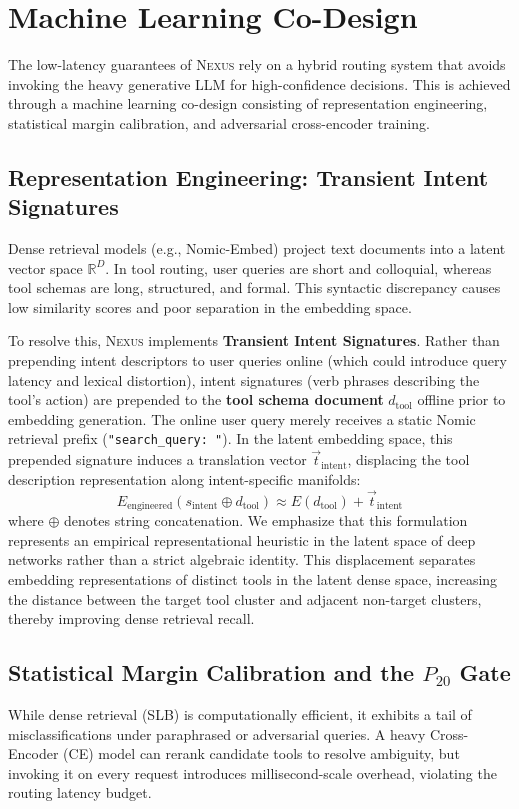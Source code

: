 \section{Machine Learning Co-Design}
\label{sec:ml-routing}

The low-latency guarantees of \textsc{Nexus} rely on a hybrid routing system that avoids invoking the heavy generative LLM for high-confidence decisions. This is achieved through a machine learning co-design consisting of representation engineering, statistical margin calibration, and adversarial cross-encoder training.

\subsection{Representation Engineering: Transient Intent Signatures}
Dense retrieval models (e.g., Nomic-Embed) project text documents into a latent vector space $\mathbb{R}^D$. In tool routing, user queries are short and colloquial, whereas tool schemas are long, structured, and formal. This syntactic discrepancy causes low similarity scores and poor separation in the embedding space.

To resolve this, \textsc{Nexus} implements \textbf{Transient Intent Signatures}. Rather than prepending intent descriptors to user queries online (which could introduce query latency and lexical distortion), intent signatures (verb phrases describing the tool's action) are prepended to the \textbf{tool schema document} $d_{\text{tool}}$ offline prior to embedding generation. The online user query merely receives a static Nomic retrieval prefix (\texttt{"search\_query: "}). In the latent embedding space, this prepended signature induces a translation vector $\vec{t}_{\text{intent}}$, displacing the tool description representation along intent-specific manifolds:
\begin{equation}
E_{\text{engineered}}(s_{\text{intent}} \oplus d_{\text{tool}}) \approx E(d_{\text{tool}}) + \vec{t}_{\text{intent}}
\end{equation}
where $\oplus$ denotes string concatenation. We emphasize that this formulation represents an empirical representational heuristic in the latent space of deep networks rather than a strict algebraic identity. This displacement separates embedding representations of distinct tools in the latent dense space, increasing the distance between the target tool cluster and adjacent non-target clusters, thereby improving dense retrieval recall.

\subsection{Statistical Margin Calibration and the $P_{20}$ Gate}
While dense retrieval (SLB) is computationally efficient, it exhibits a tail of misclassifications under paraphrased or adversarial queries. A heavy Cross-Encoder (CE) model can rerank candidate tools to resolve ambiguity, but invoking it on every request introduces millisecond-scale overhead, violating the routing latency budget.

